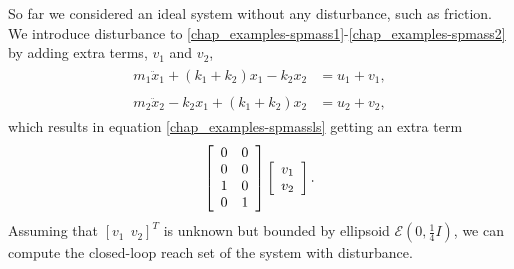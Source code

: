 \documentclass[letterpaper,10pt,english]{sphinxmanual}
\begin{document}
So far we considered an ideal system without any disturbance, such as
friction. We introduce disturbance to \eqref{chap_examples-spmass1}-\eqref{chap_examples-spmass2} by adding
extra terms, $v_1$ and $v_2$,
\label{chap_examples:equation-smdist1}\begin{gather}
\begin{split}m_1\ddot{x}_1+(k_1+k_2)x_1-k_2x_2 & = u_1 + v_1,\end{split}\label{chap_examples-smdist1}
\end{gather}\label{chap_examples:equation-smdist2}\begin{gather}
\begin{split}m_2\ddot{x}_2-k_2x_1+(k_1+k_2)x_2 & = u_2 + v_2,\end{split}\label{chap_examples-smdist2}
\end{gather}
which results in equation \eqref{chap_examples-spmassls} getting an extra term
\begin{gather}
\begin{split}\left[\begin{array}{cc}
0 & 0\\
0 & 0\\
1 & 0\\
0 & 1\end{array}\right]\left[\begin{array}{c}
v_1\\
v_2\end{array}\right].\end{split}\notag
\end{gather}
Assuming that $[v_1 ~~ v_2]^T$ is unknown but bounded by
ellipsoid ${\mathcal E}(0, \frac{1}{4}I)$, we can compute the
closed-loop reach set of the system with disturbance.
\end{document}
